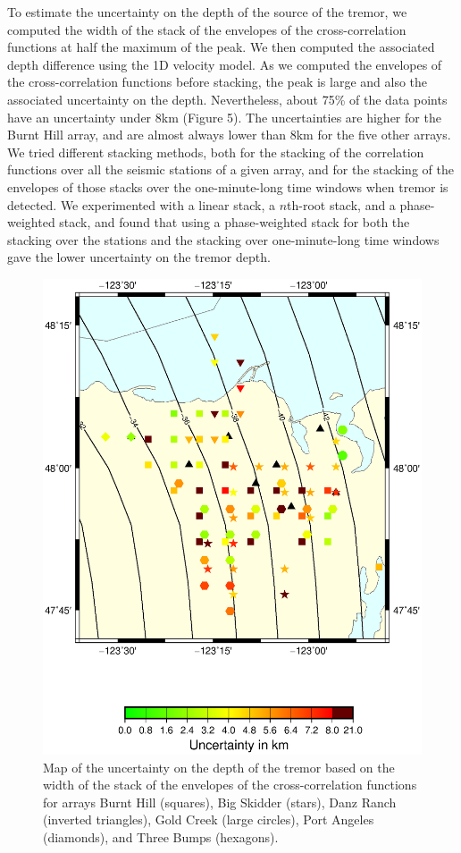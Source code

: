 \documentclass[draft]{agujournal2019}
\begin{document}
To estimate the uncertainty on the depth of the source of the tremor, we computed the width of the stack of the envelopes of the cross-correlation functions at half the maximum of the peak. We then computed the associated depth difference using the 1D velocity model. As we computed the envelopes of the cross-correlation functions before stacking, the peak is large and also the associated uncertainty on the depth. Nevertheless, about 75\% of the data points have an uncertainty under 8km (Figure 5). The uncertainties are higher for the Burnt Hill array, and are almost always lower than 8km for the five other arrays. We tried different stacking methods, both for the stacking of the correlation functions over all the seismic stations of a given array, and for the stacking of the envelopes of those stacks over the one-minute-long time windows when tremor is detected. We experimented with a linear stack, a $n$th-root stack, and a phase-weighted stack, and found that using a phase-weighted stack for both the stacking over the stations and the stacking over one-minute-long time windows gave the lower uncertainty on the tremor depth. \\

\begin{figure}
\noindent\includegraphics[width=\textwidth, trim={1cm 5cm 3.5cm 4cm},clip]{figures/uncertainty_PWS_PWS.eps}
\caption{Map of the uncertainty on the depth of the tremor based on the width of the stack of the envelopes of the cross-correlation functions for arrays Burnt Hill (squares), Big Skidder (stars), Danz Ranch (inverted triangles),  Gold Creek (large circles), Port Angeles (diamonds), and Three Bumps (hexagons).}
\label{pngfiguresample}
\end{figure}
\end{document}
